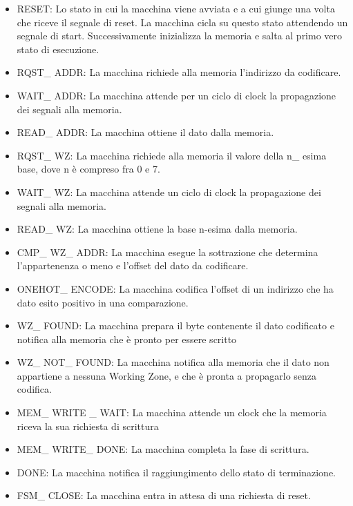 \documentclass{article}
\begin{document}
\begin{itemize}

\item RESET: Lo stato in cui la macchina viene avviata e a cui giunge una volta che riceve il segnale di reset. La macchina cicla su questo stato attendendo un segnale di start. Successivamente inizializza la memoria e salta al primo vero stato di esecuzione.

\item RQST\_ ADDR: La macchina richiede alla memoria l'indirizzo da codificare.

\item WAIT\_ ADDR: La macchina attende per un ciclo di clock la propagazione dei segnali alla memoria.

\item READ\_ ADDR: La macchina ottiene il dato dalla memoria.

\item RQST\_ WZ: La macchina richiede alla memoria il valore della n\_ esima base, dove n è compreso fra 0 e 7.

\item WAIT\_ WZ: La macchina attende un ciclo di clock la propagazione dei segnali alla memoria.

\item READ\_ WZ: La macchina ottiene la base n-esima dalla memoria.

\item CMP\_ WZ\_ ADDR: La macchina esegue la sottrazione che determina l'appartenenza o meno e l'offset del dato da codificare.

\item ONEHOT\_ ENCODE: La macchina codifica l'offset di un indirizzo che ha dato esito positivo in una comparazione.

\item WZ\_ FOUND: La macchina prepara il byte contenente il dato codificato e notifica alla memoria che è pronto per essere scritto

\item WZ\_ NOT\_ FOUND: La macchina notifica alla memoria che il dato non appartiene a nessuna Working Zone, e che è pronta a propagarlo senza codifica.

\item MEM\_ WRITE \_ WAIT: La macchina attende un clock che la memoria riceva la sua richiesta di scrittura

\item MEM\_ WRITE\_ DONE: La macchina completa la fase di scrittura.

\item DONE: La macchina notifica il raggiungimento dello stato di terminazione.

\item FSM\_ CLOSE: La macchina entra in attesa di una richiesta di reset.

\end{itemize}
\end{document}
